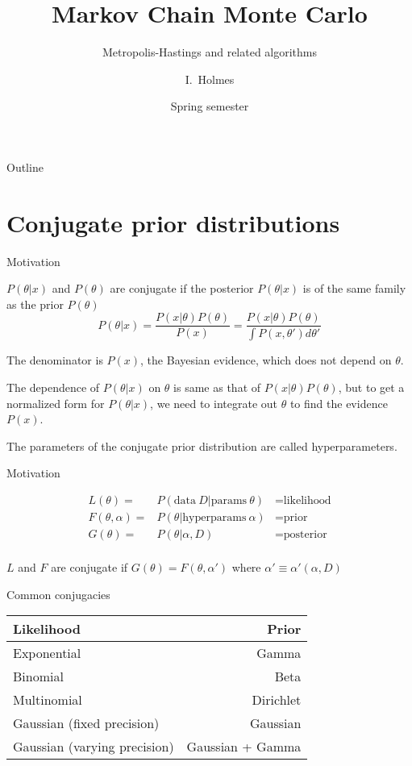 \documentclass{beamer}
\title[MCMC] %
{Markov Chain Monte Carlo}
\subtitle
{Metropolis-Hastings and related algorithms} %
\author%
{I.~Holmes} %
\institute[University of California, Berkeley] %
{
  Department of Bioengineering\\
  University of California, Berkeley}
\date%
{Spring semester}
\begin{document}
\begin{frame}
  \titlepage
\end{frame}

\begin{frame}{Outline}
  \tableofcontents
\end{frame}

\section{Conjugate prior distributions}

\begin{frame}{Motivation}

\itemb
\item $P(\theta|x)$ and $P(\theta)$ are \alert{conjugate} if the posterior $P(\theta|x)$ is of the same family as the prior $P(\theta)$
\[
P(\theta|x) = \frac{P(x|\theta) P(\theta)}{P(x)} = \frac{P(x|\theta) P(\theta)}{\int P(x,\theta') d\theta'}
\]
\item The denominator is $P(x)$, the \alert{Bayesian evidence}, which does not depend on $\theta$.
\item The dependence of $P(\theta|x)$ on $\theta$ is same as that of $P(x|\theta)P(\theta)$,
but to get a normalized form for $P(\theta|x)$, we need to integrate out $\theta$ to find the evidence $P(x)$.
\item The parameters of the conjugate prior distribution are called \alert{hyperparameters}.
\iteme

\end{frame}

\begin{frame}{Motivation}

\begin{eqnarray*}
L(\theta) = & P(\mbox{data}\ D|\mbox{params}\ \theta) & = \mbox{likelihood} \\
F(\theta,\alpha) = & P(\theta|\mbox{hyperparams}\ \alpha) & = \mbox{prior} \\
G(\theta) = & P(\theta|\alpha, D) & = \mbox{posterior} \\
\end{eqnarray*}

$L$ and $F$ are conjugate if $G(\theta) = F(\theta,\alpha')$ where $\alpha' \equiv \alpha'(\alpha,D)$

\end{frame}

\begin{frame}{Common conjugacies}

\begin{tabular}{lr}
Likelihood & Prior \\
\hline
Exponential & Gamma \\
Binomial & Beta \\
Multinomial & Dirichlet \\
Gaussian (fixed precision) & Gaussian \\
Gaussian (varying precision) & Gaussian + Gamma \\
\end{tabular}

\end{frame}
\end{document}
